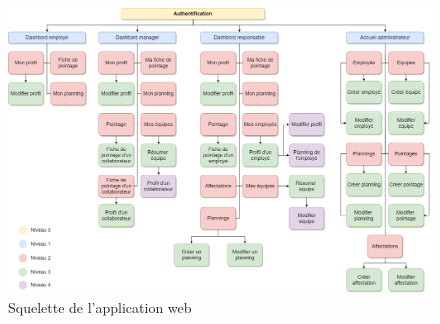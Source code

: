 \clearpage
\thispagestyle{empty}
\begin{landscape}
    \begin{figure}[h!]
        \centering
        \includegraphics[scale=0.44 ]{images/interface/arbre.png}
        \caption{Squelette de l'application web}
        \label{fig90}
    \end{figure}  
\end{landscape}

\clearpage

